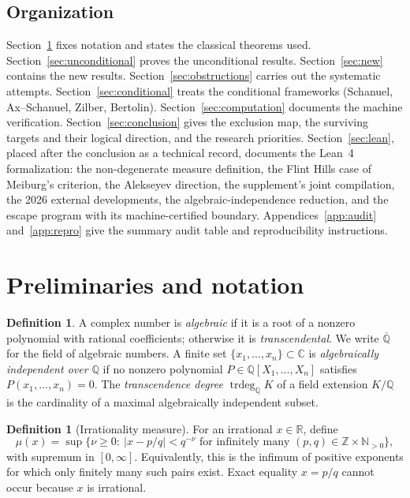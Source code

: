 \documentclass[11pt]{amsart}
\theoremstyle{definition}
\newtheorem{definition}[theorem]{Definition}
\theoremstyle{remark}
\numberwithin{equation}{section}
\newcommand{\Q}{\mathbb{Q}}
\newcommand{\R}{\mathbb{R}}
\newcommand{\C}{\mathbb{C}}
\newcommand{\Z}{\mathbb{Z}}
\newcommand{\N}{\mathbb{N}}
\newcommand{\Qbar}{\overline{\mathbb{Q}}}
\newcommand{\trdeg}{\operatorname{trdeg}}
\newcommand{\irr}{\mu}
\begin{document}
\subsection{Organization} Section~\ref{sec:prelim} fixes notation and states the classical theorems used. Section~\ref{sec:unconditional} proves the unconditional results. Section~\ref{sec:new} contains the new results. Section~\ref{sec:obstructions} carries out the systematic attempts. Section~\ref{sec:conditional} treats the conditional frameworks (Schanuel, Ax--Schanuel, Zilber, Bertolin). Section~\ref{sec:computation} documents the machine verification. Section~\ref{sec:conclusion} gives the exclusion map, the surviving targets and their logical direction, and the research priorities. Section~\ref{sec:lean}, placed after the conclusion as a technical record, documents the Lean~4 formalization: the non-degenerate measure definition, the Flint Hills case of Meiburg's criterion, the Alekseyev direction, the supplement's joint compilation, the 2026 external developments, the algebraic-independence reduction, and the escape program with its machine-certified boundary. Appendices~\ref{app:audit} and~\ref{app:repro} give the summary audit table and reproducibility instructions.

\section{Preliminaries and notation}\label{sec:prelim}

\begin{definition}
A complex number is \emph{algebraic} if it is a root of a nonzero polynomial with rational coefficients; otherwise it is \emph{transcendental}. We write $\Qbar$ for the field of algebraic numbers. A finite set $\{x_1,\dots,x_n\}\subset\C$ is \emph{algebraically independent over $\Q$} if no nonzero polynomial $P\in\Q[X_1,\dots,X_n]$ satisfies $P(x_1,\dots,x_n)=0$. The \emph{transcendence degree} $\trdeg_\Q K$ of a field extension $K/\Q$ is the cardinality of a maximal algebraically independent subset.
\end{definition}

\begin{definition}[Irrationality measure]\label{def:measure}
For an irrational $x\in\R$, define
\[
\irr(x)=\sup\{\nu\ge0:\ |x-p/q|<q^{-\nu}
\text{ for infinitely many }(p,q)\in\Z\times\N_{>0}\},
\]
with supremum in $[0,\infty]$. Equivalently, this is the infimum of positive exponents for which only finitely many such pairs exist. Exact equality $x=p/q$ cannot occur because $x$ is irrational.
\end{definition}
\end{document}
